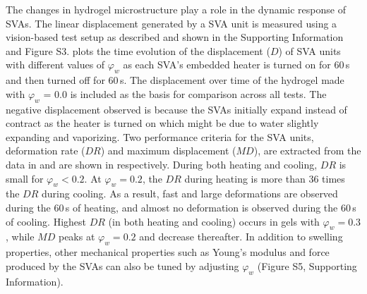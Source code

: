 The changes in hydrogel microstructure play a role in the dynamic response of SVAs. The linear displacement generated by a SVA unit
is measured using a vision-based test setup as described and shown in the Supporting Information and Figure S3.  plots the time evolution of the displacement ($D$) of SVA units with different values of $\varphi_w$ 
as each SVA's embedded heater is turned on for 60\,s 
and then turned off for 60\,s. The displacement over time of the hydrogel made with \(\varphi_{w}\) = 0.0 is included as the basis for comparison across all tests. The negative displacement observed is because the SVAs initially expand instead of contract as the heater is turned on which might be due to water slightly expanding and vaporizing. Two performance criteria for the SVA units, deformation rate ($DR$) and maximum displacement ($MD$), are extracted from the data in  and are shown in  respectively. During both heating and cooling, $DR$ is small for \(\varphi_{w} < 0.2\). At \(\varphi_{w} = 0.2\), the $DR$ during heating is more than 36 times the $DR$ during cooling. As a result, fast and large deformations are observed during the 60\,s of heating, and almost no deformation is observed during the 60\,s of cooling. 
Highest $DR$ (in both heating and cooling) occurs in gels with $\varphi_w = 0.3$, while $MD$ peaks at $\varphi_w = 0.2$ and decrease thereafter.
In addition to swelling properties, other mechanical properties such as Young's modulus and force produced by the SVAs can also be tuned by adjusting \(\varphi_{w}\) (Figure S5, Supporting Information).\\ 
